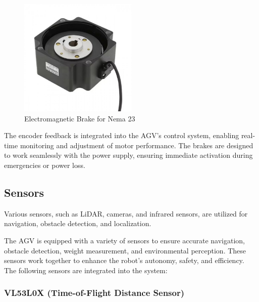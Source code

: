 \documentclass[../../main]{subfiles}
\begin{document}
\begin{figure}[H]
    \centering
    \includegraphics[width=0.5\textwidth]{fig/brakes.jpg}
    \caption{ Electromagnetic Brake for Nema 23 }
    \label{ Electromagnetic Brake} %
\end{figure}

The encoder feedback is integrated into the AGV's control system, enabling real-time monitoring and adjustment of motor performance. The brakes are designed to work seamlessly with the power supply, ensuring immediate activation during emergencies or power loss.

\subsection{Sensors}
Various sensors, such as LiDAR, cameras, and infrared sensors, are utilized for
navigation, obstacle detection, and localization.

The AGV is equipped with a variety of sensors to ensure accurate 
navigation, obstacle detection, weight measurement, and environmental 
perception. These sensors work together to enhance the robot's 
autonomy, safety, and efficiency. The following sensors are integrated 
into the system:

\subsubsection{VL53L0X (Time-of-Flight Distance Sensor)}
\end{document}
